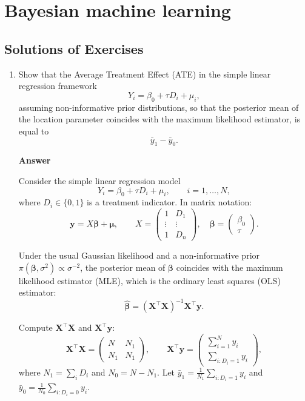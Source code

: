 \chapter{Bayesian machine learning}\label{chap12}

\section*{Solutions of Exercises}\label{sec12_1}
\begin{enumerate}[leftmargin=*]
\item Show that the Average Treatment Effect (ATE) in the simple linear regression framework
\[
Y_i = \beta_0 + \tau D_i + \mu_i,
\]
assuming non-informative prior distributions, so that the posterior mean of the location parameter coincides with the maximum likelihood estimator, is equal to
\[
\bar{y}_1 - \bar{y}_0.
\]

\textbf{Answer}

Consider the simple linear regression model
\[
Y_i = \beta_0 + \tau D_i + \mu_i, \qquad i = 1,\dots,N,
\]
where $D_i \in \{0,1\}$ is a treatment indicator. In matrix notation:
\[
\mathbf{y} = X \boldsymbol{\beta} + \boldsymbol{\mu}, \qquad
X = \begin{pmatrix}
	1 & D_1 \\
	\vdots & \vdots \\
	1 & D_n
\end{pmatrix}, \quad
\boldsymbol{\beta} = \begin{pmatrix}\beta_0 \\ \tau \end{pmatrix}.
\]

Under the usual Gaussian likelihood and a non-informative prior $\pi(\boldsymbol{\beta},\sigma^2) \propto \sigma^{-2}$, the posterior mean of $\boldsymbol{\beta}$ coincides with the maximum likelihood estimator (MLE), which is the ordinary least squares (OLS) estimator:
\[
\widehat{\boldsymbol{\beta}} = (\mathbf{X}^\top \mathbf{X})^{-1} \mathbf{X}^\top \mathbf{y}.
\]

Compute $\mathbf{X}^\top \mathbf{X}$ and $\mathbf{X}^\top \mathbf{y}$:
\[
\mathbf{X}^\top \mathbf{X} =
\begin{pmatrix}
	N & N_1 \\
	N_1 & N_1
\end{pmatrix}, \qquad
\mathbf{X}^\top \mathbf{y} =
\begin{pmatrix}
	\sum_{i=1}^N y_i \\
	\sum_{i:D_i=1} y_i
\end{pmatrix},
\]
where $N_1 = \sum_i D_i$ and $N_0 = N - N_1$. Let $\bar{y}_1 = \frac{1}{N_1}\sum_{i:D_i=1} y_i$ and $\bar{y}_0 = \frac{1}{N_0}\sum_{i:D_i=0} y_i$.


\end{enumerate}
